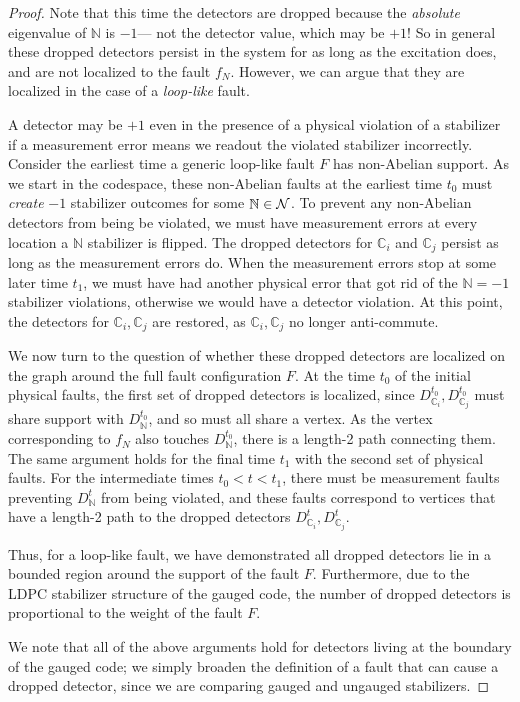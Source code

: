 \documentclass[11pt]{article}
\begin{document}
\begin{proof}
Note that this time the detectors are dropped because the \emph{absolute} eigenvalue of $\mathbb{N}$ is $-1$--- not the detector value, which may be $+1$! So in general these dropped detectors persist in the system for as long as the excitation does, and are not localized to the fault $f_N$. However, we can argue that they are localized in the case of a \emph{loop-like} fault. 

A detector may be $+1$ even in the presence of a physical violation of a stabilizer if a measurement error means we readout the violated stabilizer incorrectly. Consider the earliest time a generic loop-like fault $F$ has non-Abelian support. As we start in the codespace, these non-Abelian faults at the earliest time $t_0$ must \emph{create} $-1$ stabilizer outcomes for some $\mathbb{N} \in \mathcal{N}$. To prevent any non-Abelian detectors from being be violated, we must have measurement errors at every location a $\mathbb{N}$ stabilizer is flipped. The dropped detectors for $\mathbb{C}_i$ and $\mathbb{C}_j$ persist as long as the measurement errors do. When the measurement errors stop at some later time $t_1$, we must have had another physical error that got rid of the $\mathbb{N} = -1$ stabilizer violations, otherwise we would have a detector violation. At this point, the detectors for $\mathbb{C}_i, \mathbb{C}_j$ are restored, as $\mathbb{C}_i, \mathbb{C}_j$ no longer anti-commute.

We now turn to the question of whether these dropped detectors are localized on the graph around the full fault configuration $F$. 
At the time $t_0$ of the initial physical faults, the first set of dropped detectors is localized, since $D_{\mathbb{C}_i}^{t_0}, D_{\mathbb{C}_j}^{t_0}$ must share support with $D_{\mathbb{N}}^{t_0}$, and so must all share a vertex. 
As the vertex corresponding to $f_N$ also touches $D_{\mathbb{N}}^{t_0}$, there is a length-2 path connecting them. 
The same argument holds for the final time $t_1$ with the second set of physical faults. For the intermediate times $t_0 < t < t_1$, there must be measurement faults preventing $D_{\mathbb{N}}^t$ from being violated, and these faults correspond to vertices that have a length-2 path to the dropped detectors $D_{\mathbb{C}_i}^{t}, D_{\mathbb{C}_j}^t$. 

Thus, for a loop-like fault, we have demonstrated all dropped detectors lie in a bounded region around the support of the fault $F$. Furthermore, due to the LDPC stabilizer structure of the gauged code, the number of dropped detectors is proportional to the weight of the fault $F$.

We note that all of the above arguments hold for detectors living at the boundary of the gauged code; we simply broaden the definition of a fault that can cause a dropped detector, since we are comparing gauged and ungauged stabilizers.


\end{proof}
\end{document}
